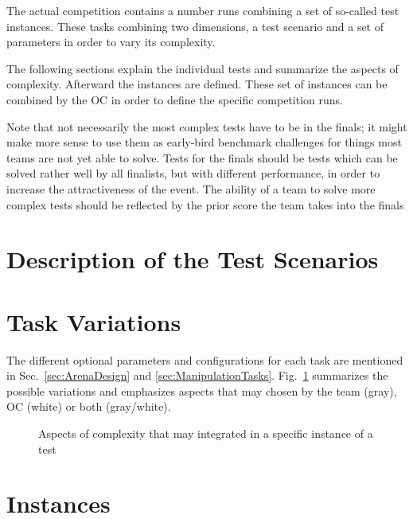 
The actual competition contains a number runs combining a set of so-called
test instances. These tasks combining two dimensions, a test scenario and a
set of parameters in order to vary its complexity.

The following sections explain the individual tests and summarize the aspects of
complexity. Afterward the instances are defined. These set of instances can
be combined by the OC in order to define the specific competition runs.

Note that not necessarily the most complex tests have to be in the finals;
it might make more sense to use them as early-bird benchmark challenges for
things most teams are not yet able to solve. Tests for the finals should be
tests which can be solved rather well by all finalists, but with different
performance, in order to increase the attractiveness of the event. The ability
of a team to solve more complex tests should be reflected by the prior score
the team takes into the finals

\section{Description of the Test Scenarios}











\section{Task Variations}

The different optional parameters and configurations for each task are 
mentioned in Sec.~\ref{sec:ArenaDesign} and \ref{sec:ManipulationTasks}. 
Fig.~\ref{fig:complexityTree} summarizes the possible variations and 
emphasizes aspects that may chosen by the team (gray), OC (white) or both 
(gray/white).

\begin{figure}[ht]
\centering

\caption{Aspects of complexity that may integrated in a specific instance of a test}
\label{fig:complexityTree}
\end{figure}


\section{Instances}

